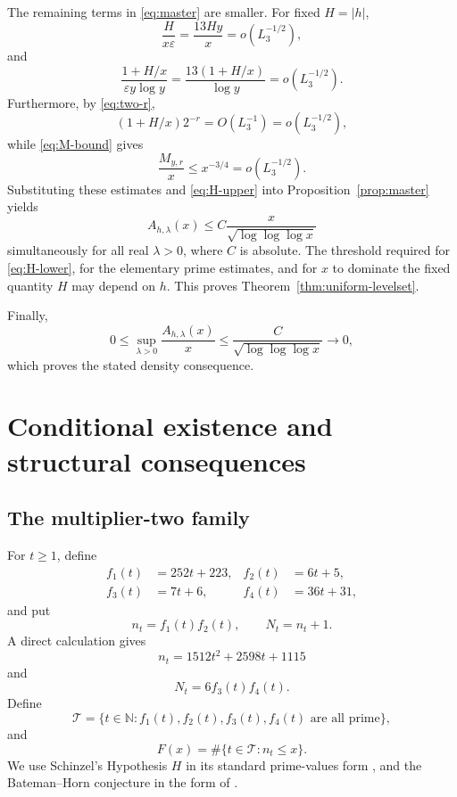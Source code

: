 \documentclass[11pt,reqno]{amsart}
\numberwithin{equation}{section}
\theoremstyle{plain}
\theoremstyle{definition}
\theoremstyle{remark}
\newcommand{\N}{\mathbb N}
\begin{document}
The remaining terms in \eqref{eq:master} are smaller. For fixed $H=|h|$,
\[
\frac{H}{x\varepsilon}=\frac{13Hy}{x}=o(L_3^{-1/2}),
\]
and
\[
\frac{1+H/x}{\varepsilon y\log y}
=
\frac{13(1+H/x)}{\log y}=o(L_3^{-1/2}).
\]
Furthermore, by \eqref{eq:two-r},
\[
(1+H/x)2^{-r}=O(L_3^{-1})=o(L_3^{-1/2}),
\]
while \eqref{eq:M-bound} gives
\[
\frac{M_{y,r}}x\le x^{-3/4}=o(L_3^{-1/2}).
\]
Substituting these estimates and \eqref{eq:H-upper} into Proposition~\ref{prop:master} yields
\[
A_{h,\lambda}(x)
\le
C\frac{x}{\sqrt{\log\log\log x}}
\]
simultaneously for all real $\lambda>0$, where $C$ is absolute. The threshold required for \eqref{eq:H-lower}, for the elementary prime estimates, and for $x$ to dominate the fixed quantity $H$ may depend on $h$. This proves Theorem~\ref{thm:uniform-levelset}.

Finally,
\[
0\le\sup_{\lambda>0}\frac{A_{h,\lambda}(x)}x
\le
\frac{C}{\sqrt{\log\log\log x}}\longrightarrow0,
\]
which proves the stated density consequence.
\section{Conditional existence and structural consequences}\label{sec:conditional}

\subsection{The multiplier-two family}

For $t\ge1$, define
\[
\begin{aligned}
f_1(t)&=252t+223, & f_2(t)&=6t+5,\\
f_3(t)&=7t+6, & f_4(t)&=36t+31,
\end{aligned}
\]
and put
\[
n_t=f_1(t)f_2(t),\qquad N_t=n_t+1.
\]
A direct calculation gives
\[
n_t=1512t^2+2598t+1115
\]
and
\begin{equation}\label{eq:Nt}
N_t=6f_3(t)f_4(t).
\end{equation}
Define
\[
\mathcal T
=
\{t\in\N:f_1(t),f_2(t),f_3(t),f_4(t)\text{ are all prime}\},
\]
and
\[
F(x)=\#\{t\in\mathcal T:n_t\le x\}.
\]
We use Schinzel's Hypothesis $H$ in its standard prime-values form
\cite{SchinzelSierpinski1958,SchinzelSierpinskiCorr1959}, and the
Bateman--Horn conjecture in the form of \cite{BatemanHorn1962}.
\end{document}
